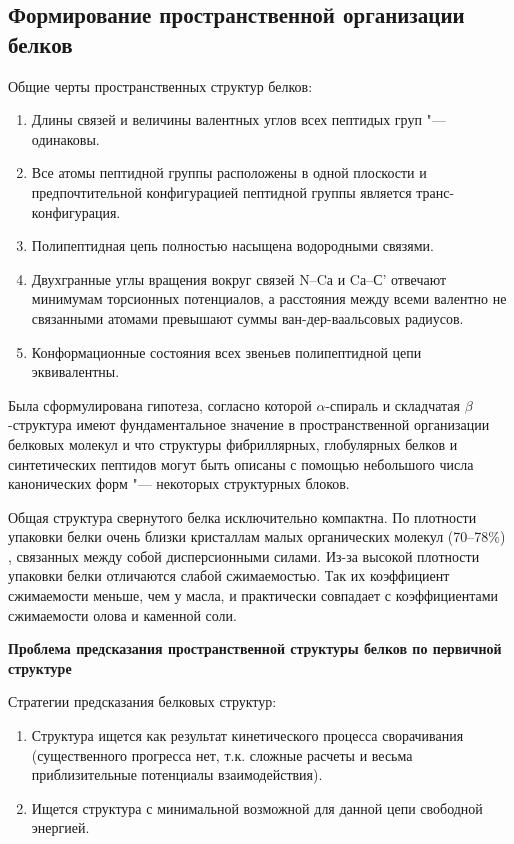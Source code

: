 \documentclass[12pt,a4paper,oneside]{book}
\begin{document}
\subsection{Формирование пространственной организации белков}

Общие черты пространственных структур белков:
\begin{enumerate}
\item Длины связей и величины валентных углов всех пептидых груп "--- одинаковы.
\item Все атомы пептидной группы расположены в одной плоскости и предпочтительной конфигурацией пептидной группы является транс-конфигурация.
\item Полипептидная цепь полностью насыщена водородными связями.
\item Двухгранные углы вращения вокруг связей N--Cа и Cа--С' отвечают минимумам торсионных потенциалов, а расстояния между всеми валентно не связанными атомами превышают суммы ван-дер-ваальсовых радиусов.
\item Конформационные состояния всех звеньев полипептидной цепи эквивалентны.
\end{enumerate}

Была сформулирована гипотеза, согласно которой $\alpha$-спираль и складчатая $\beta$-структура имеют фундаментальное значение в пространственной организации белковых молекул и что структуры фибриллярных, глобулярных белков и синтетических пептидов могут быть описаны с помощью небольшого числа канонических форм "--- некоторых структурных блоков.

Общая структура свернутого белка исключительно компактна. По плотности упаковки белки очень близки кристаллам малых органических молекул (70--78\%) , связанных между собой дисперсионными силами. Из-за высокой плотности упаковки белки отличаются слабой сжимаемостью. Так их коэффициент сжимаемости меньше, чем у масла, и практически совпадает с коэффициентами сжимаемости олова и каменной соли.

\textbf{Проблема предсказания пространственной структуры белков по первичной структуре}

Стратегии предсказания белковых структур:
\begin{enumerate}
\item Структура ищется как результат кинетического процесса сворачивания (существенного прогресса нет, т.к. сложные расчеты и весьма приблизительные потенциалы взаимодействия).
\item Ищется структура с минимальной возможной для данной цепи свободной энергией.
\end{enumerate}
\end{document}
